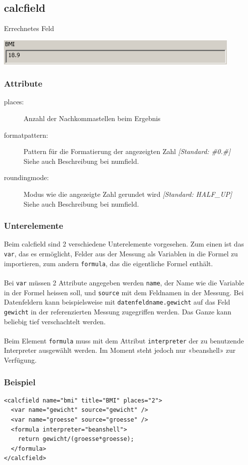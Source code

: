 \documentclass[a4paper]{scrartcl}
\begin{document}
\subsection{calcfield}
Errechnetes Feld
\begin{center}
    \includegraphics[width=12cm]{images/calcfield.png}
\end{center}
\subsubsection{Attribute}
\begin{description}
    \item[places:] Anzahl der Nachkommastellen beim Ergebnis
    \item [formatpattern:] Pattern für die Formatierung der angezeigten Zahl \textit{[Standard: \#0.\#]}\\
    Siehe auch Beschreibung bei numfield.
    \item [roundingmode:] Modus wie die angezeigte Zahl gerundet wird \textit{[Standard: HALF\_UP]}\\
    Siehe auch Beschreibung bei numfield.
\end{description}
\subsubsection{Unterelemente}
Beim calcfield sind 2 verschiedene Unterelemente vorgesehen. Zum einen ist das
\texttt{var}, das es ermöglicht, Felder aus der Messung als Variablen in die
Formel zu importieren, zum andern \texttt{formula}, das die eigentliche Formel
enthält.\\
\\
Bei \texttt{var} müssen 2 Attribute angegeben werden \texttt{name}, der
Name wie die Variable in der Formel heissen soll, und \texttt{source} mit dem
Feldnamen in der Messung. Bei Datenfeldern kann beispielsweise mit
\texttt{datenfeldname.gewicht} auf das Feld \texttt{gewicht} in der
re\-fe\-ren\-zier\-ten Messung zugegriffen werden. Das Ganze kann beliebig tief
verschachtelt werden.\\
\\
Beim Element \texttt{formula} muss mit dem Attribut \texttt{interpreter} der zu
benutzende Interpreter ausgewählt werden. Im Moment steht jedoch nur «beanshell»
zur Verfügung.
\subsubsection{Beispiel}
\begin{lstlisting}
<calcfield name="bmi" title="BMI" places="2">
  <var name="gewicht" source="gewicht" />
  <var name="groesse" source="groesse" />
  <formula interpreter="beanshell">
    return gewicht/(groesse*groesse);
  </formula>
</calcfield>
\end{lstlisting}
\end{document}
